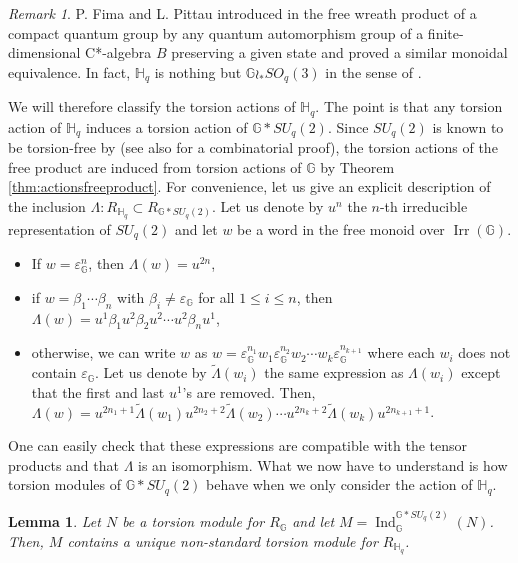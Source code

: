 \documentclass[a4paper, 11pt]{amsart}
\theoremstyle{plain}
\newtheorem{lem}[thm]{Lemma}
\theoremstyle{definition}
\theoremstyle{remark}
\newtheorem{rem}[thm]{Remark}
\DeclareMathOperator{\Ind}{Ind}
\DeclareMathOperator{\Irr}{Irr}
\newcommand{\G}{\mathbb{G}}
\newcommand{\HH}{\mathbb{H}}
\begin{document}
\begin{rem}
P. Fima and L. Pittau introduced in \cite{fima2015free} the free wreath product of a compact quantum group by any quantum automorphism group of a finite-dimensional C*-algebra $B$ preserving a given state and proved a similar monoidal equivalence. In fact, $\HH_{q}$ is nothing but $\G\wr_{\ast} SO_{q}(3)$ in the sense of \cite[Def 2.6]{fima2015free}.
\end{rem}

We will therefore classify the torsion actions of $\HH_{q}$. The point is that any torsion action of $\HH_{q}$ induces a torsion action of $\G\ast SU_{q}(2)$. Since $SU_{q}(2)$ is known to be torsion-free by \cite[Prop 3.2]{voigt2011baum} (see also \cite[Prop 1.23]{arano2015torsion} for a combinatorial proof), the torsion actions of the free product are induced from torsion actions of $\G$ by Theorem \ref{thm:actionsfreeproduct}. For convenience, let us give an explicit description of the inclusion $\Lambda : R_{\HH_{q}}\subset R_{\G\ast SU_{q}(2)}$. Let us denote by $u^{n}$ the $n$-th irreducible representation of $SU_{q}(2)$ and let $w$ be a word in the free monoid over $\Irr(\G)$.
\begin{itemize}
\item If $w = \varepsilon_{\G}^{n}$, then $\Lambda(w) = u^{2n}$,
\item if $w = \beta_{1}\cdots \beta_{n}$ with $\beta_{i}\neq \varepsilon_{\G}$ for all $1\leqslant i\leqslant n$, then $\Lambda(w) = u^{1}\beta_{1}u^{2}\beta_{2}u^{2}\cdots u^{2}\beta_{n}u^{1}$,
\item otherwise, we can write $w$ as $w = \varepsilon^{n_{1}}_{\G}w_{1}\varepsilon^{n_{2}}_{\G}w_{2}\cdots w_{k}\varepsilon^{n_{k+1}}_{\G}$ where each $w_{i}$ does not contain $\varepsilon_{\G}$. Let us denote by $\widetilde{\Lambda}(w_{i})$ the same expression as $\Lambda(w_{i})$ except that the first and last $u^{1}$'s are removed. Then, $\Lambda(w) = u^{2n_{1}+1}\widetilde{\Lambda}(w_{1})u^{2n_{2}+2}\widetilde{\Lambda}(w_{2})\cdots u^{2n_{k}+2}\widetilde{\Lambda}(w_{k})u^{2n_{k+1}+1}$.
\end{itemize}
One can easily check that these expressions are compatible with the tensor products and that $\Lambda$ is an isomorphism. What we now have to understand is how torsion modules of $\G\ast SU_{q}(2)$ behave when we only consider the action of $\HH_{q}$.

\begin{lem}\label{lem:torsionwreathproduct}
Let $N$ be a torsion module for $R_{\G}$ and let $M = \Ind_{\G}^{\G\ast SU_{q}(2)}(N)$. Then, $M$ contains a unique non-standard torsion module for $R_{\HH_{q}}$.
\end{lem}
\end{document}
